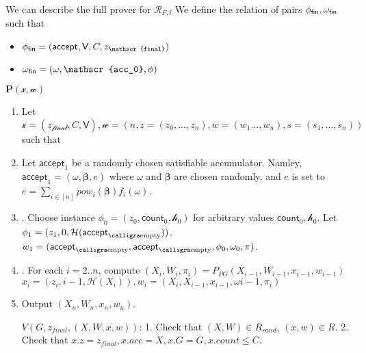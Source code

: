 \documentclass[11pt]{article} %
\newcommand{\acc}{\ensuremath{\mathsf{accept}}\xspace}
\newcommand{\hash}{\ensuremath{\mathcal{H}}\xspace}
\newcommand{\prv}{\ensuremath{\mathsf{\mathbf{P}}}\xspace}
\newcommand{\prf}{\ensuremath{\mathsf{\pi}}\xspace}
\newcommand{\inst}{\ensuremath{\phi}\xspace}
\newcommand{\wit}{\ensuremath{\mathsf{\omega}}\xspace}
\newcommand{\inpF}{\ensuremath{\mathscr{x}}\xspace}
\newcommand{\witF}{\ensuremath{\mathscr{w}}\xspace}
\newcommand{\acchash}{\ensuremath{\mathscr{h}}\xspace}
\newcommand{\accprev}{\ensuremath{\mathscr{acc_0}}\xspace}
\newcommand{\cnt}{\ensuremath{\mathsf{count}}\xspace}
\newcommand{\rel}{\ensuremath{\mathcal{R}}\xspace}
\newcommand{\betaa}{\ensuremath{\mathbf{\boldsymbol{\beta}}}\xspace}
\newcommand{\zfin}{\ensuremath{z_{\mathscr{final}}}\xspace}
\newcommand{\recset}{\ensuremath{\mathsf{V}}\xspace}
\newcommand{\finpred}{\ensuremath{\mathsf{f}}\xspace}
\begin{document}
We can describe the full prover for $\rel_{F,\finpred}$
We define the relation \relfin of pairs $\instfin,\witfin$ such that
\begin{itemize}
 \item $\instfin = (\acc,\recset,C,\zfin)$
 \item $\witfin = (\wit,\accprev,\inst)$
\end{itemize}

$\prv(\inpF,\witF)$
\begin{enumerate}
 \item Let
$\inpF=(\zfin,C,\recset),\witF=(n,z=(z_0,\ldots,z_n),w=(w_1\ldots,w_n),s=(s_1,\ldots,s_n))$ such that

\item Let $\acc_1$ be a randomly chosen satisfiable accumulator. Namley, $\acc_1=(\wit,\betaa,e)$ where $\wit$ and $\betaa$ are chosen randomly, and $e$ is set to $e=\sum_{i\in [n]}pow_i(\betaa)f_i(\wit)$. 

\item.  Choose instance $\inst_0=(z_0,\cnt_0,\acchash_0)$ for arbitrary values $\cnt_0,\acchash_0$. Let $\inst_1=(z_1,0,\hash(\emptyacc))$, $w_1=(\emptyacc,\emptyacc, \inst_0, \wit_0, \prf)$. 

\item. For each $i=2..n$, compute 
$(X_i,W_i,\pi_i) = P_{PG}(X_{i-1},W_{i-1},x_{i-1},w_{i-1})$
$x_i = (z_i,i-1,\hash(X_i)), w_i=(X_i,X_{i-1},x_{i-1},\wit{i-1},\prf_i)$

\item Output $(X_n,W_n,x_n,w_n)$.

$V(G,z_{final}, (X,W,x,w))$:
1. Check that $(X,W)\in R_{rand}$, $(x,w)\in R$.
2. Check that $x.z=z_{final},x.acc =X,x.G=G,x.count\leq C$.
\end{enumerate}
\end{document}
